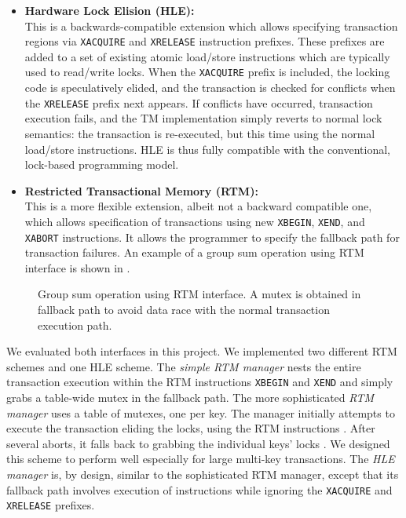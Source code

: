 \begin{itemize} 
\item \textbf{Hardware Lock Elision (HLE):} \\ This is a backwards-compatible
  extension which allows specifying transaction regions via \texttt{XACQUIRE}
  and \texttt{XRELEASE} instruction prefixes. These prefixes are added to a set
  of existing atomic load/store instructions which are typically used to
  read/write locks. When the \texttt{XACQUIRE} prefix is included, the locking
  code is speculatively elided, and the transaction is checked for conflicts
  when the \texttt{XRELEASE} prefix next appears. If conflicts have occurred,
  transaction execution fails, and the TM implementation simply reverts to
  normal lock semantics: the transaction is re-executed, but this time using the
  normal load/store instructions. HLE is thus fully compatible with the
  conventional, lock-based programming model. \\
\item \textbf{Restricted Transactional Memory (RTM):} \\ This is a more flexible
  extension, albeit not a backward compatible one, which allows specification of
  transactions using new \texttt{XBEGIN}, \texttt{XEND}, and \texttt{XABORT}
  instructions. It allows the programmer to specify the fallback path for
  transaction failures. An example of a group sum operation using RTM interface
  is shown in .\\
\end{itemize}

 \begin{figure}
    \parbox[t]{0.45\textwidth}{} \caption{Group
        sum operation using RTM interface. A mutex is obtained in fallback path
to avoid data race with the normal transaction execution path.} \label{fig:rtm}
\end{figure}

We evaluated both interfaces in this project. We implemented two different RTM
schemes and one HLE scheme.  The \textit{simple RTM manager} nests the entire
transaction execution within the RTM instructions \texttt{XBEGIN} and
\texttt{XEND} and simply grabs a table-wide mutex in the fallback path.  The
more sophisticated \textit{RTM manager} uses a table of mutexes, one per
key. The manager initially attempts to execute the transaction eliding the
locks, using the RTM instructions \citep{tsx-guide}. After several aborts, it
falls back to grabbing the individual keys' locks . We designed this scheme to
perform well especially for large multi-key transactions.  The \textit{HLE
  manager} is, by design, similar to the sophisticated RTM manager, except that
its fallback path involves execution of instructions while ignoring the
\texttt{XACQUIRE} and \texttt{XRELEASE} prefixes.

